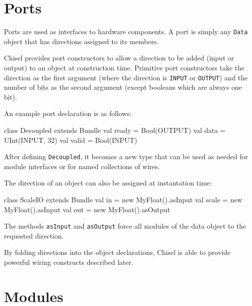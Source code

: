 \documentclass[twocolumn,10pt]{article}
\def\code#1{{\tt #1}}
\begin{document}
\section{Ports}

Ports are used as interfaces to hardware components.  A port is simply
any \code{Data} object that has directions assigned to its members.

Chisel provides port constructors to allow a direction to be added
(input or output) to an object at construction time.  Primitive port
constructors take the direction as the first
argument (where the direction is \code{INPUT} or
\code{OUTPUT}) and the number of bits as the second argument (except
booleans which are always one bit).

An example port declaration is as follows:
\begin{scala}
class Decoupled extends Bundle {
  val ready = Bool(OUTPUT)
  val data  = UInt(INPUT, 32)
  val valid = Bool(INPUT)
}
\end{scala}

\noindent
After defining \code{Decoupled}, it becomes a new type that can be
used as needed for module interfaces or for named collections of
wires.

The direction of an object can also be assigned at instantation time:
\begin{scala}
class ScaleIO extends Bundle {
  val in    = new MyFloat().asInput
  val scale = new MyFloat().asInput
  val out   = new MyFloat().asOutput
}
\end{scala}

\noindent
The methods \code{asInput} and \code{asOutput} force all modules of
the data object to the requested direction.

By folding directions into the object declarations, Chisel is able to
provide powerful wiring constructs described later.



\section{Modules}
\end{document}
